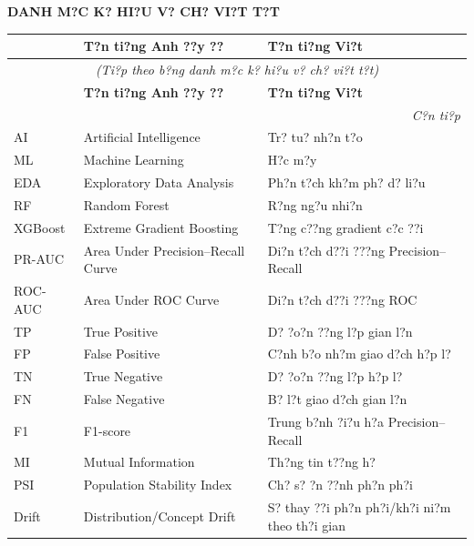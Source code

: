 \cleardoublepage
{}
\thispagestyle{empty}
\begin{center}
    {\bfseries\LARGE DANH M?C K? HI?U V? CH? VI?T T?T}
\end{center}\vspace{1em}
\begingroup
\setlength\LTleft{0pt}
\setlength\LTright{0pt}
\small
\begin{longtable}{@{}p{2.5cm} p{6.5cm} p{5.5cm}@{}}
\toprule
\textbf{} & \textbf{T?n ti?ng Anh ??y ??} & \textbf{T?n ti?ng Vi?t} \\
\midrule
\endfirsthead
\multicolumn{3}{c}{\itshape (Ti?p theo b?ng danh m?c k? hi?u v? ch? vi?t t?t)}\\
\textbf{} & \textbf{T?n ti?ng Anh ??y ??} & \textbf{T?n ti?ng Vi?t} \\
\midrule
\endhead
\midrule
\multicolumn{3}{r}{\itshape C?n ti?p}\\
\endfoot
\bottomrule
\endlastfoot
AI & Artificial Intelligence & Tr? tu? nh?n t?o \\
ML & Machine Learning & H?c m?y \\
EDA & Exploratory Data Analysis & Ph?n t?ch kh?m ph? d? li?u \\
RF & Random Forest & R?ng ng?u nhi?n \\
XGBoost & Extreme Gradient Boosting & T?ng c??ng gradient c?c ??i \\
PR-AUC & Area Under Precision--Recall Curve & Di?n t?ch d??i ???ng Precision--Recall \\
ROC-AUC & Area Under ROC Curve & Di?n t?ch d??i ???ng ROC \\
TP & True Positive & D? ?o?n ??ng l?p gian l?n \\
FP & False Positive & C?nh b?o nh?m giao d?ch h?p l? \\
TN & True Negative & D? ?o?n ??ng l?p h?p l? \\
FN & False Negative & B? l?t giao d?ch gian l?n \\
F1 & F1-score & Trung b?nh ?i?u h?a Precision--Recall \\
MI & Mutual Information & Th?ng tin t??ng h? \\
PSI & Population Stability Index & Ch? s? ?n ??nh ph?n ph?i \\
Drift & Distribution/Concept Drift & S? thay ??i ph?n ph?i/kh?i ni?m theo th?i gian \\
\end{longtable}
\endgroup
\restoregeometry
